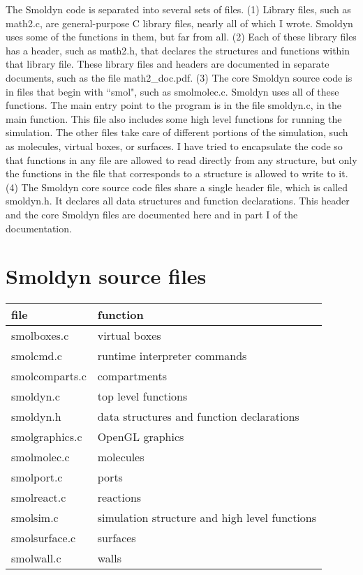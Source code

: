 \documentclass {book}
\begin{document}
The Smoldyn code is separated into several sets of files. (1) Library files, such as math2.c, are general-purpose C library files, nearly all of which I wrote. Smoldyn uses some of the functions in them, but far from all. (2) Each of these library files has a header, such as math2.h, that declares the structures and functions within that library file. These library files and headers are documented in separate documents, such as the file math2\_doc.pdf. (3) The core Smoldyn source code is in files that begin with ``smol", such as smolmolec.c. Smoldyn uses all of these functions. The main entry point to the program is in the file smoldyn.c, in the main function. This file also includes some high level functions for running the simulation. The other files take care of different portions of the simulation, such as molecules, virtual boxes, or surfaces. I have tried to encapsulate the code so that functions in any file are allowed to read directly from any structure, but only the functions in the file that corresponds to a structure is allowed to write to it. (4) The Smoldyn core source code files share a single header file, which is called smoldyn.h. It declares all data structures and function declarations. This header and the core Smoldyn files are documented here and in part I of the documentation.

\section{Smoldyn source files}

\begin{longtable}[c]{ll}
file & function\\
\hline
smolboxes.c & virtual boxes\\
smolcmd.c & runtime interpreter commands\\
smolcomparts.c & compartments\\
smoldyn.c & top level functions\\
smoldyn.h & data structures and function declarations\\
smolgraphics.c & OpenGL graphics\\
smolmolec.c & molecules\\
smolport.c & ports\\
smolreact.c & reactions\\
smolsim.c & simulation structure and high level functions\\
smolsurface.c & surfaces\\
smolwall.c & walls\\
\end{longtable}
\end{document}
